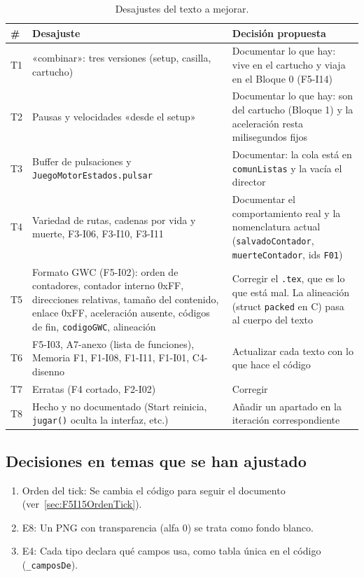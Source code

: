 \begin{table}[H]
	\centering
	\begin{tabularx}{\textwidth}{l >{\RaggedRight\arraybackslash}X >{\RaggedRight\arraybackslash}X}
		\toprule
		\textbf{\#} & \textbf{Desajuste} & \textbf{Decisión propuesta} \\
		\midrule
		
		T1 & «combinar»: tres versiones (setup, casilla, cartucho) & Documentar lo que hay: vive en el cartucho y viaja en el Bloque 0 (F5-I14) \\
		T2 & Pausas y velocidades «desde el setup» & Documentar lo que hay: son del cartucho (Bloque 1) y la aceleración resta milisegundos fijos \\
		T3 & Buffer de pulsaciones y \texttt{JuegoMotorEstados.pulsar} & Documentar: la cola está en \texttt{comunListas} y la vacía el director \\
		T4 & Variedad de rutas, cadenas por vida y muerte, F3-I06, F3-I10, F3-I11 & Documentar el comportamiento real y la nomenclatura actual (\texttt{salvadoContador}, \texttt{muerteContador}, ids \texttt{F01}) \\
		T5 & Formato GWC (F5-I02): orden de contadores, contador interno 0xFF, direcciones relativas, tamaño del contenido, enlace 0xFF, aceleración ausente, códigos de fin, \texttt{codigoGWC}, alineación & Corregir el \texttt{.tex}, que es lo que está mal. La alineación (struct \texttt{packed} en C) pasa al cuerpo del texto \\
		T6 & F5-I03, A7-anexo (lista de funciones), Memoria F1, F1-I08, F1-I11, F1-I01, C4-disenno & Actualizar cada texto con lo que hace el código \\
		T7 & Erratas (F4 cortado, F2-I02) & Corregir \\
		T8 & Hecho y no documentado (Start reinicia, \texttt{jugar()} oculta la interfaz, etc.) & Añadir un apartado en la iteración correspondiente \\
		\bottomrule
	\end{tabularx}
	\caption{Desajustes del texto a mejorar.}
\end{table}

\subsection{Decisiones en temas que se han ajustado}
\label{sec:F5I15Decisiones}

\begin{enumerate}
	\item Orden del tick: Se cambia el código para seguir el documento  (ver~\ref{sec:F5I15OrdenTick}).
	\item E8: Un PNG con transparencia (alfa 0) se trata como fondo blanco.
	\item E4: Cada tipo declara qué campos usa, como tabla única en el código (\texttt{\_camposDe}).
\end{enumerate}


